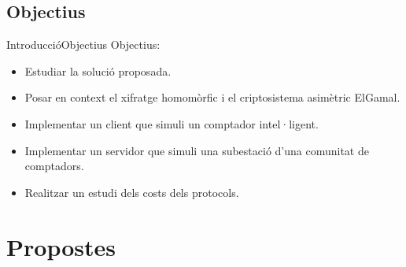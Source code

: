 \documentclass{beamer}
\begin{document}
\subsection{Objectius}
\begin{frame}{Introducció}{Objectius}
	Objectius:
	\begin{itemize}
		\item Estudiar la solució proposada.
		\item Posar en context el xifratge homomòrfic i el criptosistema asimètric ElGamal.
		\item Implementar un client que simuli un comptador intel·ligent.
		\item Implementar un servidor que simuli una subestació d'una comunitat de comptadors.
		\item Realitzar un estudi dels costs dels protocols.
	\end{itemize}
\end{frame}

\section{Propostes}
\end{document}
